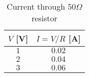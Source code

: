 \begin{table}[ht]
	\begin{center}
	\caption{Current through $50 \Omega$ resistor}
	\label{tab:table_ohm2}
		\begin{tabular}{cc}
		\toprule
			$V$ [V] & $I=V/R$ [A]\\
			\midrule
			$1$ & $0.02$\\
			$2$ & $0.04$\\
			$3$ & $0.06$\\
		\bottomrule
		\end{tabular}
	\end{center}
\end{table}